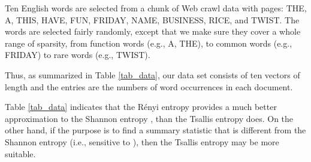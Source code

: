 \documentclass{sig-alternate}
\begin{document}
Ten English words are selected from a chunk of Web crawl data with  pages: THE, A, THIS, HAVE, FUN, FRIDAY, NAME, BUSINESS, RICE, and TWIST. The words are selected fairly randomly, except that we make sure they cover a whole range of sparsity, from function words (e.g., A, THE), to  common words (e.g., FRIDAY) to rare words (e.g., TWIST).

Thus, as summarized in Table \ref{tab_data},  our data set consists of ten vectors of length  and the entries are the numbers of word occurrences in each document.

Table \ref{tab_data} indicates that the R\'enyi entropy  provides a much better approximation to the Shannon entropy , than the Tsallis entropy  does. On the other hand, if the purpose is to find a summary statistic that is different from the Shannon entropy (i.e., sensitive to ), then the Tsallis entropy may be more suitable.
\end{document}
